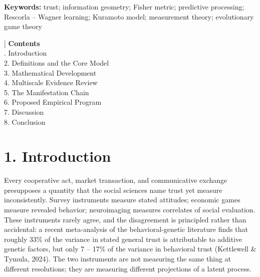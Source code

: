 \documentclass[11pt,twocolumn]{article}
\theoremstyle{gttdef}
\theoremstyle{gttplain}
\begin{document}
{\begin{@twocolumnfalse}
\begin{abstract}
obtained result and not a derived constant --- together with a falsifiable closed-loop consequence: at $\lambda = 0.61$ the trust dynamics are underdamped and ring after betrayal events with period $\approx 7.2$ steps under the minimal one-step loop closure $E_{t+1} = S_t$ (the period drifts $7.2 \to 17.7$ steps across smoothing closures and vanishes under zero-delay closure, \S{}6; tests must verify the closure or joint-fit $(\lambda, \alpha)$) (predicted 7.17; the recurrence's roots are the prediction, so the in-silico 7.15 is an implementation check, not corroboration). One vector state and update law, instantiated at three levels: the GTT vector is instantiated biologically through a five-channel neuromodulatory architecture and behaviorally through a domain-agnostic trust-measurement protocol (companion preprints deposited at OSF; the first application, to finance, is specified separately).
\end{abstract}
\smallskip\noindent \textbf{Keywords:} trust; information geometry; Fisher metric; predictive processing; Rescorla -- Wagner learning; Kuramoto model; measurement theory; evolutionary game theory
\bigskip
\end{@twocolumnfalse}}]
\medskip
\noindent\textbf{Contents}\\[3pt]
{\small{}. Introduction\\
2. Definitions and the Core Model\\
3. Mathematical Development\\
4. Multiscale Evidence Review\\
5. The Manifestation Chain\\
6. Proposed Empirical Program\\
7. Discussion\\
8. Conclusion\\
}
\medskip


\section*{1. Introduction}

Every cooperative act, market transaction, and communicative exchange presupposes a quantity that the social sciences name trust yet measure inconsistently. Survey instruments measure stated attitudes; economic games measure revealed behavior; neuroimaging measures correlates of social evaluation. These instruments rarely agree, and the disagreement is principled rather than accidental: a recent meta-analysis of the behavioral-genetic literature finds that roughly 33\% of the variance in stated general trust is attributable to additive genetic factors, but only 7 -- 17\% of the variance in behavioral trust (Kettlewell \& Tymula, 2024). The two instruments are not measuring the same thing at different resolutions; they are measuring different projections of a latent process.
\end{document}
